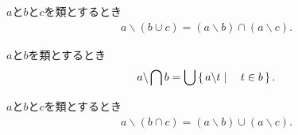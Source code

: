	\begin{screen}
		\begin{thm}[二つの類の合併の差類は差類同士の交叉]
		\label{thm:difference_of_union_of_two_classes_is_intersection_of_two_differences}
			$a$と$b$と$c$を類とするとき
			\begin{align}
				a \backslash (b \cup c) = (a \backslash b) \cap (a \backslash c).
			\end{align}
		\end{thm}
	\end{screen}
	
	\begin{screen}
		\begin{thm}[交叉を引いた類は要素の差の合併で書ける]
		\label{thm:difference_of_intersection_is_union_of_differences_of_elements}
			$a$と$b$を類とするとき
			\begin{align}
				a \backslash \bigcap b = \bigcup \left\{\, a \backslash t \mid \quad t \in b\, \right\}.
			\end{align}
		\end{thm}
	\end{screen}
	
	\begin{screen}
		\begin{thm}[二つの類の交叉の差類は差類同士の合併]
		\label{thm:difference_of_intersection_of_two_classes_is_union_of_two_differences}
			$a$と$b$と$c$を類とするとき
			\begin{align}
				a \backslash (b \cap c) = (a \backslash b) \cup (a \backslash c).
			\end{align}
		\end{thm}
	\end{screen}
	
	\begin{screen}
		\begin{thm}
			
		\end{thm}
	\end{screen}
	

